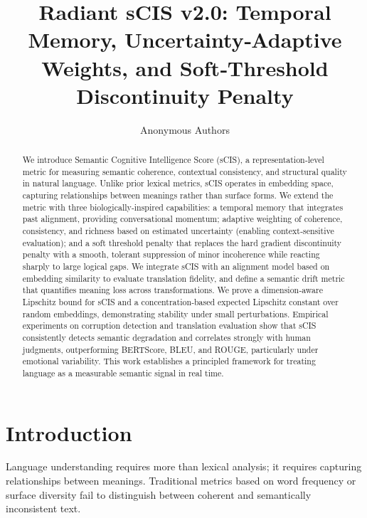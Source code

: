 \documentclass[11pt]{article}
\title{\textbf{Radiant sCIS v2.0:} Temporal Memory, Uncertainty‑Adaptive Weights, and Soft‑Threshold Discontinuity Penalty}
\author{Anonymous Authors}
\date{}
\theoremstyle{definition}
\begin{document}
\maketitle

\begin{abstract}
We introduce Semantic Cognitive Intelligence Score (sCIS), a representation‑level metric for measuring semantic coherence, contextual consistency, and structural quality in natural language. Unlike prior lexical metrics, sCIS operates in embedding space, capturing relationships between meanings rather than surface forms. We extend the metric with three biologically‑inspired capabilities: a temporal memory that integrates past alignment, providing conversational momentum; adaptive weighting of coherence, consistency, and richness based on estimated uncertainty (enabling context‑sensitive evaluation); and a soft threshold penalty that replaces the hard gradient discontinuity penalty with a smooth, tolerant suppression of minor incoherence while reacting sharply to large logical gaps. We integrate sCIS with an alignment model based on embedding similarity to evaluate translation fidelity, and define a semantic drift metric that quantifies meaning loss across transformations. We prove a dimension‑aware Lipschitz bound for sCIS and a concentration‑based expected Lipschitz constant over random embeddings, demonstrating stability under small perturbations. Empirical experiments on corruption detection and translation evaluation show that sCIS consistently detects semantic degradation and correlates strongly with human judgments, outperforming BERTScore, BLEU, and ROUGE, particularly under emotional variability. This work establishes a principled framework for treating language as a measurable semantic signal in real time.
\end{abstract}

\section{Introduction}

Language understanding requires more than lexical analysis; it requires capturing relationships between meanings. Traditional metrics based on word frequency or surface diversity fail to distinguish between coherent and semantically inconsistent text.
\end{document}
